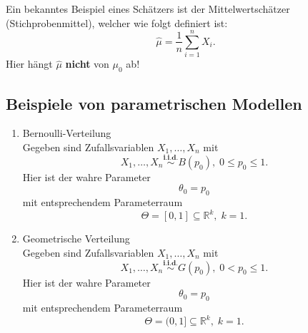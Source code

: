 \documentclass[10pt]{article}
\newcommand{\FZV}{X_1, \ldots, X_n} %
\newcommand{\IR}{\mathbb{R}} %
\newenvironment{BSP}[1][]
{\begin{Beispiel}[frametitle=#1]}{\end{Beispiel}}
\begin{document}
	 \begin{BSP}[Beispiel 1.1.1 (Mittelwertschätzer)]
	 	Ein bekanntes Beispiel eines Schätzers ist der Mittelwertschätzer (Stichprobenmittel), welcher wie folgt definiert ist:
	 	\begin{equation*}
	 			\hat{\mu}=\frac{1}{n}\sum_{i=1}^{n} X_i.
	 	\end{equation*}
	 	Hier hängt $\hat{\mu}$ \textbf{nicht} von $\mu_0$ ab!
	 \end{BSP}
	
	

\pagebreak %
\subsection{Beispiele von parametrischen Modellen}
	\begin{BSP}[Beispiel 1.1.2 (parametrische Modelle)]
		\begin{enumerate}[label = (\roman*)]
			\item Bernoulli-Verteilung \\
			Gegeben sind Zufallsvariablen $\FZV$ mit
			\begin{equation*}
				\FZV \overset{\textbf{i.i.d.}}{\sim} B(p_0), \; 0 \leq p_0 \leq 1.
			\end{equation*} 
			Hier ist der wahre Parameter 
			\begin{equation*}
				\theta_0 = p_0
			\end{equation*}
			mit entsprechendem Parameterraum
			\begin{equation*}
				\Theta = [0,1] \subseteq \IR^k,\; k=1.
			\end{equation*}
			
			\item Geometrische Verteilung \\
			Gegeben sind Zufallsvariablen $\FZV$ mit
			\begin{equation*}
				\FZV \overset{\textbf{i.i.d.}}{\sim} G(p_0), \; 0 < p_0 \leq 1.
			\end{equation*} 
			Hier ist der wahre Parameter 
			\begin{equation*}
				\theta_0 = p_0
			\end{equation*}
			mit entsprechendem Parameterraum
			\begin{equation*}
				\Theta = (0,1] \subseteq \IR^k,\; k=1.
			\end{equation*}
			

\end{enumerate}
\end{BSP}
\end{document}

